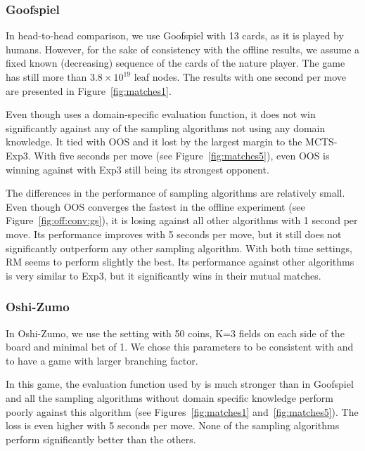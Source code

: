 \subsubsection{Goofspiel}

In head-to-head comparison, we use Goofspiel with 13 cards, as it is played by humans. However, for the sake of consistency with the offline results, we assume a fixed known (decreasing) sequence of the cards of the nature player. The game has still more than $3.8\times 10^19$ leaf nodes. The results with one second per move are presented in Figure~\ref{fig:matches1}.

Even though \doab uses a domain-specific evaluation function, it does not win significantly against any of the sampling algorithms not using any domain knowledge. It tied with OOS and it lost by the largest margin to the MCTS-Exp3. With five seconds per move (see Figure~\ref{fig:matches5}), even OOS is winning against \doab with Exp3 still being its strongest opponent.

The differences in the performance of sampling algorithms are relatively small. Even though OOS converges the fastest in the offline experiment (see Figure~\ref{fig:off:conv:gs}), it is losing against all other algorithms with 1 second per move. Its performance improves with 5 seconds per move, but it still does not significantly outperform any other sampling algorithm. With both time settings, RM seems to perform slightly the best. Its performance against other algorithms is very similar to Exp3, but it significantly wins in their mutual matches.

\subsubsection{Oshi-Zumo}

In Oshi-Zumo, we use the setting with 50 coins, K=3 fields on each side of the board and minimal bet of 1. We chose this parameters to be consistent with \cite{} and to have a game with larger branching factor.

In this game, the evaluation function used by \doab is much stronger than in Goofspiel and all the sampling algorithms without domain specific knowledge perform poorly against this algorithm (see Figures~\ref{fig:matches1} and~\ref{fig:matches5}). The loss is even higher with 5 seconds per move. None of the sampling algorithms perform significantly better than the others.

